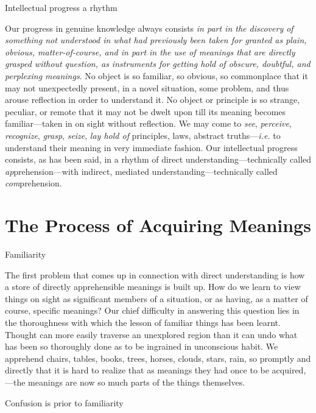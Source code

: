 \documentclass[letterpaper]{book}
\begin{document}
Intellectual progress a rhythm

Our progress in genuine knowledge always consists \emph{in part in the
discovery of something not understood in what had previously been taken
for granted as plain, obvious, matter-of-course, and in part in the use
of meanings that are directly grasped without question, as instruments
for getting hold of obscure, doubtful, and perplexing meanings}. No
object is so familiar, so obvious, so commonplace that it may not
unexpectedly present, in a novel situation, some problem, and thus
arouse reflection in order to understand it. No object or principle is
so strange, peculiar, or remote that it may not be dwelt upon till its
meaning becomes familiar---taken in on sight without reflection. We may
come to \emph{see}, \emph{perceive}, \emph{recognize}, \emph{grasp},
\emph{seize}, \emph{lay hold of} principles, laws, abstract
truths---\emph{i.e.} to understand their meaning in very immediate
fashion. Our intellectual progress consists, as has been said, in a
rhythm of direct understanding---technically called
\emph{ap}prehension---with indirect, mediated
understanding---technically called \emph{com}prehension.

\section{The Process of Acquiring Meanings}

Familiarity

The first problem that comes up in connection with direct understanding
is how a store of directly
apprehensible
meanings is built up. How do we learn to view things on sight as
significant members of a situation, or as having, as a matter of course,
specific meanings? Our chief difficulty in answering this question lies
in the thoroughness with which the lesson of familiar things has been
learnt. Thought can more easily traverse an unexplored region than it
can undo what has been so thoroughly done as to be ingrained in
unconscious habit. We apprehend chairs, tables, books, trees, horses,
clouds, stars, rain, so promptly and directly that it is hard to realize
that as meanings they had once to be acquired,---the meanings are now so
much parts of the things themselves.

Confusion is prior to familiarity
\end{document}
